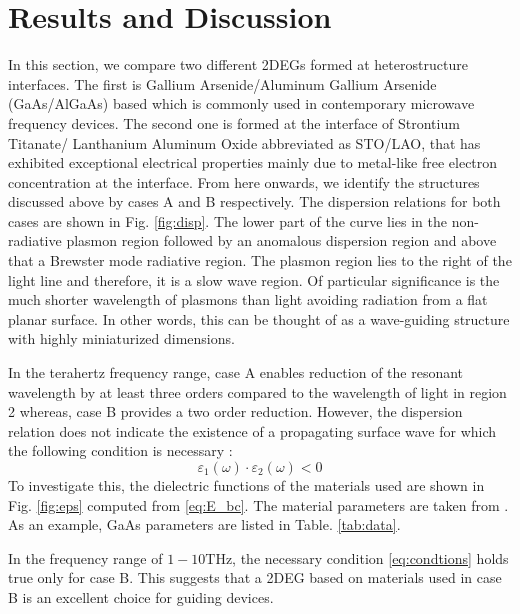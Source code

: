 \documentclass[conference, 10pt]{IEEEtran}
\renewcommand{\O}{\omega}  %
\newcommand{\E}{\varepsilon}  %
\renewcommand{\^}{\hat}  %
\begin{document}
\section{Results and Discussion}
%
In this section, we compare two different 2DEGs formed at heterostructure interfaces. The first is Gallium Arsenide/Aluminum Gallium Arsenide (GaAs/AlGaAs) based which is commonly used in contemporary microwave frequency devices. The second one is formed at the interface of Strontium Titanate/ Lanthanium Aluminum Oxide abbreviated as STO/LAO, that has exhibited exceptional electrical properties mainly due to metal-like free electron concentration at the interface. From here onwards, we identify the structures discussed above by cases A and B respectively. The dispersion relations for both cases are shown in Fig. \ref{fig:disp}. The lower part of the curve lies in the non-radiative plasmon region followed by an anomalous dispersion region and above that a Brewster mode radiative region. The plasmon region lies to the right of the light line and therefore, it is a slow wave region. Of particular significance is the much shorter wavelength of plasmons than light avoiding radiation from a flat planar surface. In other words, this can be thought of as a wave-guiding structure with highly miniaturized dimensions.
%

%
In the terahertz frequency range, case A enables reduction of the resonant wavelength by at least three orders compared to the wavelength of light in region 2 whereas, case B provides a two order reduction. However, the dispersion relation does not indicate the existence of a propagating surface wave for which the following condition is necessary \cite{nevels2016optical}:
%
\begin{equation}
  \E_1(\O) \cdot \E_2(\O) < 0
  \label{eq:condtions}
\end{equation}
%
%
To investigate this, the dielectric functions of the materials used are shown in Fig. \ref{fig:eps} computed from \eqref{eq:E_bc}. The material parameters are taken from \cite{Palik1997429, zhang1994infrared}. As an example, GaAs parameters are listed in Table. \ref{tab:data}.

In the frequency range of $1-10 \mathrm{THz}$, the necessary condition \eqref{eq:condtions} holds true only for case B. This suggests that a 2DEG based on materials used in case B is an excellent choice for guiding devices.
%
\end{document}
